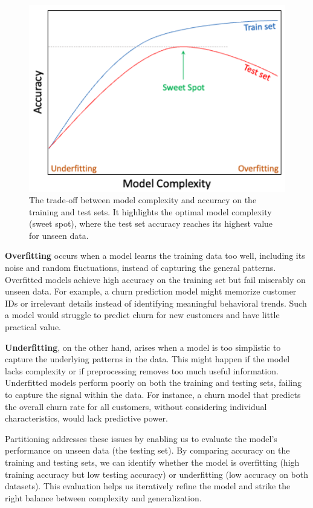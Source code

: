 \documentclass[
]{book}
\theoremstyle{definition}
\theoremstyle{definition}
\theoremstyle{definition}
\theoremstyle{definition}
\theoremstyle{remark}
\begin{document}
\begin{figure}

{\centering \includegraphics[width=0.65\linewidth]{images/model_complexity} 

}

\caption{The trade-off between model complexity and accuracy on the training and test sets. It highlights the optimal model complexity (sweet spot), where the test set accuracy reaches its highest value for unseen data.}\label{fig:model-complexity}
\end{figure}

\textbf{Overfitting} occurs when a model learns the training data too well, including its noise and random fluctuations, instead of capturing the general patterns. Overfitted models achieve high accuracy on the training set but fail miserably on unseen data. For example, a churn prediction model might memorize customer IDs or irrelevant details instead of identifying meaningful behavioral trends. Such a model would struggle to predict churn for new customers and have little practical value.

\textbf{Underfitting}, on the other hand, arises when a model is too simplistic to capture the underlying patterns in the data. This might happen if the model lacks complexity or if preprocessing removes too much useful information. Underfitted models perform poorly on both the training and testing sets, failing to capture the signal within the data. For instance, a churn model that predicts the overall churn rate for all customers, without considering individual characteristics, would lack predictive power.

Partitioning addresses these issues by enabling us to evaluate the model's performance on unseen data (the testing set). By comparing accuracy on the training and testing sets, we can identify whether the model is overfitting (high training accuracy but low testing accuracy) or underfitting (low accuracy on both datasets). This evaluation helps us iteratively refine the model and strike the right balance between complexity and generalization.
\end{document}
